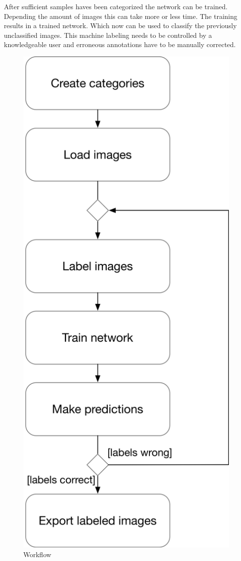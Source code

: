 After sufficient samples haves been categorized the network
can be trained. Depending the amount of images this can take more or less time. The training results in a trained network.
Which now can be used to classify the previously
unclassified images. This machine labeling needs to
be controlled by a knowledgeable user
and erroneous annotations have to be manually corrected.

\begin{figure}[H]
	\centering
\includegraphics[scale=0.6]{bilder/cyto/Ablaufdiagramm.png}
	\caption{Workflow}
	\label{fig:Workflow}
\end{figure}

